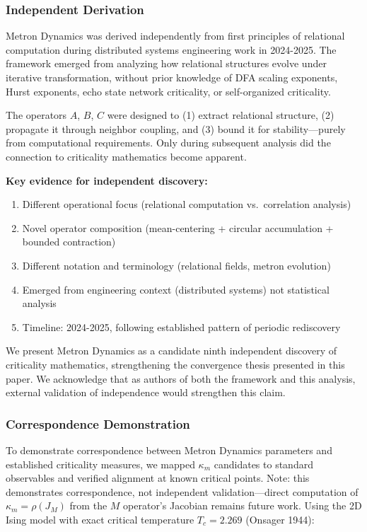 \documentclass[11pt]{article}
\begin{document}
\subsubsection{Independent Derivation}

Metron Dynamics was derived independently from first principles of relational computation during distributed systems engineering work in 2024-2025. The framework emerged from analyzing how relational structures evolve under iterative transformation, without prior knowledge of DFA scaling exponents, Hurst exponents, echo state network criticality, or self-organized criticality.

The operators $A$, $B$, $C$ were designed to (1) extract relational structure, (2) propagate it through neighbor coupling, and (3) bound it for stability---purely from computational requirements. Only during subsequent analysis did the connection to criticality mathematics become apparent.

\textbf{Key evidence for independent discovery:}
\begin{enumerate}[nosep]
    \item Different operational focus (relational computation vs.\ correlation analysis)
    \item Novel operator composition (mean-centering + circular accumulation + bounded contraction)
    \item Different notation and terminology (relational fields, metron evolution)
    \item Emerged from engineering context (distributed systems) not statistical analysis
    \item Timeline: 2024-2025, following established pattern of periodic rediscovery
\end{enumerate}

We present Metron Dynamics as a candidate ninth independent discovery of criticality mathematics, strengthening the convergence thesis presented in this paper. We acknowledge that as authors of both the framework and this analysis, external validation of independence would strengthen this claim.

\subsubsection{Correspondence Demonstration}

To demonstrate correspondence between Metron Dynamics parameters and established criticality measures, we mapped $\kappa_m$ candidates to standard observables and verified alignment at known critical points. Note: this demonstrates correspondence, not independent validation---direct computation of $\kappa_m = \rho(J_M)$ from the $M$ operator's Jacobian remains future work. Using the 2D Ising model with exact critical temperature $T_c = 2.269$ (Onsager 1944):
\end{document}
